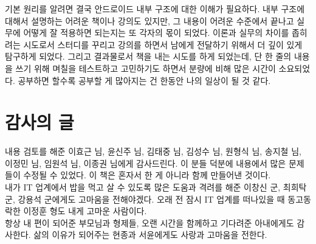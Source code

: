 \documentclass[a4paper,hidelinks,10pt,openany]{book} %
\begin{document}
기본 원리를 알려면 결국 안드로이드 내부 구조에 대한 이해가 필요하다.
내부 구조에 대해서 설명하는 어려운 책이나 강의도 있지만, 
그 내용이 어려운 수준에서 끝나고 실무에 어떻게 잘 적용하면 되는지는 또 각자의 몫이 되었다. 
이론과 실무의 차이를 좁히려는 시도로서 스터디를 꾸리고 강의를 하면서 
남에게 전달하기 위해서 더 깊이 있게 탐구하게 되었다.
그리고 결과물로서 책을 내는 시도를 하게 되었는데, 단 한 줄의 내용을 쓰기 위해 며칠을 테스트하고 고민하기도 하면서 분량에 비해 많은 시간이 소요되었다.
공부하면 할수록 공부할 게 많아지는 건 한동안 나의 일상이 될 것 같다.

\section*{감사의 글}
내용 검토를 해준 이효근 님, 윤신주 님, 김태중 님, 김성수 님, 원형식 님, 송지철 님, 이정민 님, 임원석 님, 이종권 님에게 감사드린다. 
이 분들 덕분에 내용에서 많은 문제들이 수정될 수 있었다. 이 책은 혼자서 한 게 아니라 함께 만들어낸 것이다.\\

내가 IT 업계에서 밥을 먹고 살 수 있도록 많은 도움과 격려를 해준 이창신 군, 최희탁 군, 강용석 군에게도 고마움을 전해야겠다.
오래 전 잠시 IT 업계를 떠나있을 때 동고동락한 이정훈 형도 내게 고마운 사람이다.\\

항상 내 편이 되어준 부모님과 형제들, 
오랜 시간을 함께하고 기다려준 아내에게도 감사한다. 삶의 이유가 되어주는 현종과 서윤에게도 사랑과 고마움을 전한다.

\begin{comment}
필자는 회사에서 능력을 인정받거나 화려한 기술을 가진 것도 아닌 평범한 개발자이다. 
다만 문제를 겪고 해결할 때마다 메모하고 시간을 내서 내용을 정리한 것 뿐이다.
정리한 내용은 지력이 갈수록 떨어지는 필자를 위한 것이기도 하다.\\

나도 책과 인터넷에서 많은 도움을 받았다. 
오래 전 팀 동료가 그런 얘기를 했다. ``국내 IT서적은 다 쓰레기다'' 그 동료는 책 꽂이에 원서만 나열해놓고 있었다.
어쩌면 쓰레기 하나를 더 만들었는지도 모르겠다.

좌충우돌한 이야기

예민한 내용이 많아서 오류가 있을 수 있다. 혹시 오류라고 생각한다면 제보 바란다.

죄와벌 이나 태백산맥 같은 역작을 내는 것도 아닌데, 무슨 시간이 이리 많이 걸리는지..
\end{comment}

\tableofcontents
\end{document}
